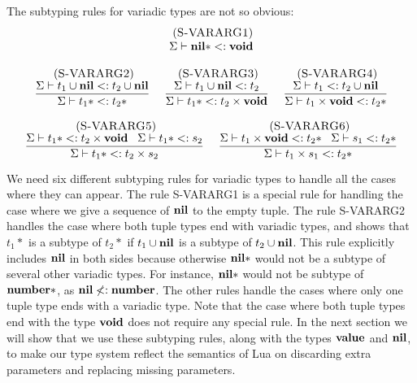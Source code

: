 The subtyping rules for variadic types are not so obvious:
\[
\begin{array}{c}
\begin{array}{c}
\; (\textsc{S-VARARG1})\\
\Sigma \vdash \mathbf{nil}{*} <: \mathbf{void}
\end{array}
\\ \\
\begin{array}{c}
\; (\textsc{S-VARARG2})\\
\dfrac{\Sigma \vdash t_{1} \cup \mathbf{nil} <: t_{2} \cup \mathbf{nil}}
      {\Sigma \vdash t_{1}{*} <: t_{2}{*}}
\end{array}
\;
\begin{array}{c}
\; (\textsc{S-VARARG3})\\
\dfrac{\Sigma \vdash t_{1} \cup \mathbf{nil} <: t_{2}}
      {\Sigma \vdash t_{1}{*} <: t_{2} \times \mathbf{void}}
\end{array}
\;
\begin{array}{c}
\; (\textsc{S-VARARG4})\\
\dfrac{\Sigma \vdash t_{1} <: t_{2} \cup \mathbf{nil}}
      {\Sigma \vdash t_{1} \times \mathbf{void} <: t_{2}{*}}
\end{array}
\\ \\
\begin{array}{c}
\; (\textsc{S-VARARG5})\\
\dfrac{\Sigma \vdash t_{1}{*} <: t_{2} \times \mathbf{void} \;\;\;
       \Sigma \vdash t_{1}{*} <: s_{2}}
      {\Sigma \vdash t_{1}{*} <: t_{2} \times s_{2}}
\end{array}
\;
\begin{array}{c}
\; (\textsc{S-VARARG6})\\
\dfrac{\Sigma \vdash t_{1} \times \mathbf{void} <: t_{2}{*} \;\;\;
       \Sigma \vdash s_{1} <: t_{2}{*}}
      {\Sigma \vdash t_{1} \times s_{1} <: t_{2}{*}}
\end{array}
\end{array}
\]

We need six different subtyping rules for variadic types
to handle all the cases where they can appear.
The rule \textsc{S-VARARG1} is a special rule for handling the
case where we give a sequence of $\mathbf{nil}$ to the empty tuple.
The rule \textsc{S-VARARG2} handles the case where both tuple types end
with variadic types, and shows that $t_{1}{*}$ is a subtype of $t_{2}{*}$
if $t_{1} \cup \mathbf{nil}$ is a subtype of $t_{2} \cup \mathbf{nil}$.
This rule explicitly includes $\mathbf{nil}$ in both sides because otherwise
$\mathbf{nil}{*}$ would not be a subtype of several other variadic types.
For instance, $\mathbf{nil}{*}$ would not be subtype of $\mathbf{number}{*}$,
as $\mathbf{nil} \not<: \mathbf{number}$.
The other rules handle the cases where only one tuple type ends with a variadic type.
Note that the case where both tuple types end with the type $\mathbf{void}$ does
not require any special rule.
In the next section we will show that we use these subtyping rules,
along with the types $\mathbf{value}$ and $\mathbf{nil}$, to make our type system reflect
the semantics of Lua on discarding extra parameters and
replacing missing parameters.

